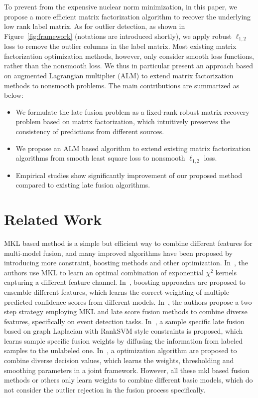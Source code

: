 \documentclass[letterpaper]{article}
\begin{document}
To prevent from the expensive nuclear norm minimization, in this paper, we propose a more efficient matrix factorization algorithm to recover the underlying low rank label matrix.
As for outlier detection, as shown in Figure~\ref{fig:framework} (notations are introduced shortly), we apply robust $\ell_{1,2}$ loss to remove the outlier columns in the label matrix.
Most existing matrix factorization optimization methods, however, only consider smooth loss functions, rather than the nonsmooth loss.
We thus in particular present an approach based on augmented Lagrangian multiplier (ALM) to extend matrix factorization methods to nonsmooth problems.
The main contributions are summarized as below:
\begin{itemize}
  \item We formulate the late fusion problem as a fixed-rank robust matrix recovery problem based on matrix factorization, which intuitively preserves the consistency of predictions from different sources.
  \item We propose an ALM based algorithm to extend existing matrix factorization algorithms from smooth least square loss to nonsmooth $\ell_{1,2}$ loss.
  \item Empirical studies show significantly improvement of our proposed method compared to existing late fusion algorithms.
\end{itemize}




\section{Related Work}

MKL based method is a simple but efficient way to combine different features for multi-model fusion,
and many improved algorithms have been proposed by introducing more constraint, boosting methods and other optimization.
In~\cite{vedaldi2009multiple}, the authors use MKL to learn an optimal combination of exponential ${\chi}^2$ kernels capturing a different feature channel.
In~\cite{gehler2009feature}, boosting approaches are proposed to ensemble different features, which learns the correct weighting of multiple predicted confidence scores from different models.
In~\cite{natarajan2012multimodal}, the authors propose a two-step strategy employing MKL and late score fusion methods to combine diverse features, specifically on event detection tasks.
In~\cite{lai2015learning}, a sample specific late fusion based on graph Laplacian with RankSVM style constraints is proposed,
which learns sample specific fusion weights by diffusing the information from labeled samples to the unlabeled one.
In~\cite{xuiccv2013feature}, a optimization algorithm are proposed to combine diverse decision values,
which learns the weights, thresholding and smoothing parameters in a joint framework.
However, all these mkl based fusion methods or others only learn weights to combine different basic models, which do not consider the outlier rejection in the fusion process specifically.
\end{document}
